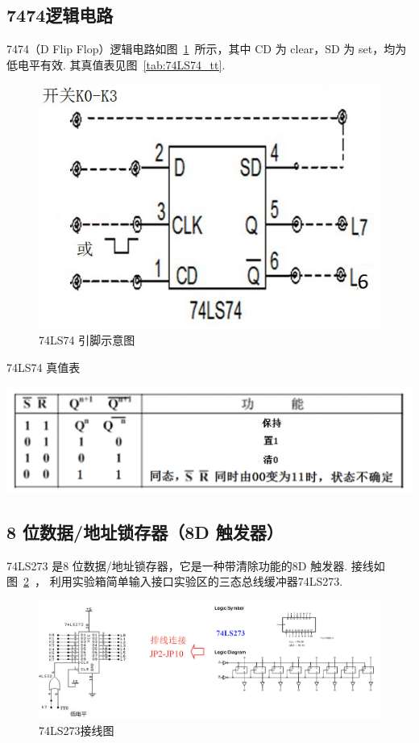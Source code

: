 \documentclass[11pt]{SEU-Digital-Report}
\begin{document}
      \newpage
      \subsection{7474逻辑电路}

        7474（D Flip Flop）逻辑电路如图~\ref{fig:74LS74_module}~所示，其中 CD 为 clear，SD 为 set，均为低电平有效.
        其真值表见图~\ref{tab:74LS74_tt}.

        \begin{figure}[htbp]
          \centering
          \includegraphics[width=.4\linewidth]{fig/74LS74_module.jpg}
          \caption{74LS74 引脚示意图\cite{guide}}
          \label{fig:74LS74_module}
        \end{figure}
        \begin{table}[htbp]
          \centering
          \caption{74LS74 真值表\cite{ppt3}}
          \includegraphics[width=.5\linewidth]{fig/74LS74_tt.png}
          \label{tab:74LS74_tt}
        \end{table}

      \subsection{8 位数据/地址锁存器（8D 触发器）}

      74LS273 是8 位数据/地址锁存器，它是一种带清除功能的8D 触发器. 接线如图~\ref{fig:74LS273_module}~，
利用实验箱简单输入接口实验区的三态总线缓冲器74LS273.

        \begin{figure}[htbp]
          \centering
          \includegraphics[width=.8\linewidth]{fig/74LS273_module.png}
          \caption{74LS273接线图}
          \label{fig:74LS273_module}
        \end{figure}
\end{document}
